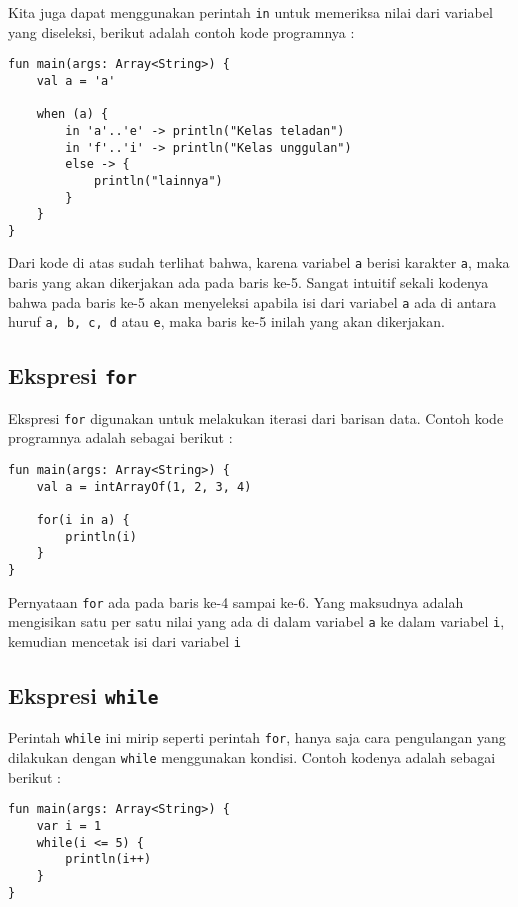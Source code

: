 Kita juga dapat menggunakan perintah \texttt{in} untuk memeriksa nilai dari variabel yang diseleksi, berikut adalah contoh kode programnya :

\begin{lstlisting}
fun main(args: Array<String>) {
	val a = 'a'

	when (a) {
		in 'a'..'e' -> println("Kelas teladan")
		in 'f'..'i' -> println("Kelas unggulan")
		else -> {
			println("lainnya")
		}
	}
}
\end{lstlisting}

Dari kode di atas sudah terlihat bahwa, karena variabel \texttt{a} berisi karakter \texttt{a}, maka baris yang akan dikerjakan ada pada baris ke-5. Sangat intuitif sekali kodenya bahwa pada baris ke-5 akan menyeleksi apabila isi dari variabel \texttt{a} ada di antara huruf \texttt{a, b, c, d} atau \texttt{e}, maka baris ke-5 inilah yang akan dikerjakan.

\subsection{Ekspresi \texttt{for}}

Ekspresi \texttt{for} digunakan untuk melakukan iterasi dari barisan data. Contoh kode programnya adalah sebagai berikut :

\begin{lstlisting}
fun main(args: Array<String>) {
	val a = intArrayOf(1, 2, 3, 4)
	
	for(i in a) {
		println(i)
	}
}
\end{lstlisting}

Pernyataan \texttt{for} ada pada baris ke-4 sampai ke-6. Yang maksudnya adalah mengisikan satu per satu nilai yang ada di dalam variabel \texttt{a} ke dalam variabel \texttt{i}, kemudian mencetak isi dari variabel \texttt{i}

\subsection{Ekspresi \texttt{while}}

Perintah \texttt{while} ini mirip seperti perintah \texttt{for}, hanya saja cara pengulangan yang dilakukan dengan \texttt{while} menggunakan kondisi. Contoh kodenya adalah sebagai berikut :

\begin{lstlisting}
fun main(args: Array<String>) {
	var i = 1
	while(i <= 5) {
		println(i++)
	}
}
\end{lstlisting}

